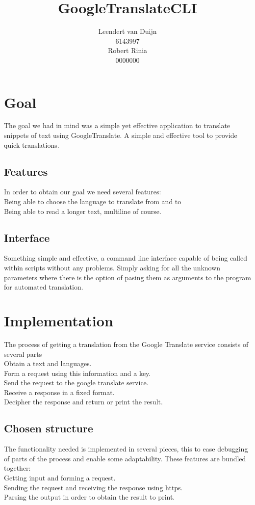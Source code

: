 \documentclass[a4paper]{article}
\author{Leendert van Duijn\\6143997\\Robert Rinia\\0000000}
\title{GoogleTranslateCLI}
\begin{document}
\maketitle
\tableofcontents
\newpage
\section{Goal}
The goal we had in mind was a simple yet effective application to translate
snippets of text using GoogleTranslate. A simple and effective tool to provide
quick translations.
\subsection{Features}
In order to obtain our goal we need several features:\\
Being able to choose the language to translate from and to\\
Being able to read a longer text, multiline of course.
\subsection{Interface}
Something simple and effective, a command line interface capable of being called
within scripts without any problems. Simply asking for all the unknown
parameters where there is the option of pasing them as arguments to the program
for automated translation.

\section{Implementation}
The process of getting a translation from the Google Translate service consists
of several parts\\
Obtain a text and languages.\\
Form a request using this information and a key.\\
Send the request to the google translate service.\\
Receive a response in a fixed format.\\
Decipher the response and return or print the result.\\
\newline
\subsection{Chosen structure}
The functionality needed is implemented in several pieces, this to ease
debugging of parts of the process and enable some adaptability. These features
are bundled together:\\
Getting input and forming a request.\\
Sending the request and receiving the response using https.\\
Parsing the output in order to obtain the result to print.\\
\end{document}
